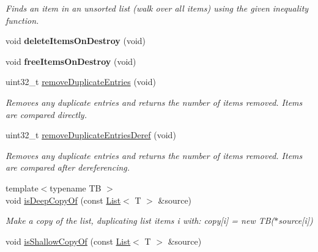 \begin{DoxyCompactItemize}
\begin{DoxyCompactList}\small\item\em \-Finds an item in an unsorted list (walk over all items) using the given inequality function. \end{DoxyCompactList}\item 
\hypertarget{classxsens_1_1List_a9fb26a3ec44163f759678e61cd8cdaf4}{void {\bfseries delete\-Items\-On\-Destroy} (void)}\label{classxsens_1_1List_a9fb26a3ec44163f759678e61cd8cdaf4}

\item 
\hypertarget{classxsens_1_1List_a066c09f452527b8235eb3a16bb3cef7d}{void {\bfseries free\-Items\-On\-Destroy} (void)}\label{classxsens_1_1List_a066c09f452527b8235eb3a16bb3cef7d}

\item 
\hypertarget{classxsens_1_1List_a0f37088f6e6cb46e2bebbc2e802321d7}{uint32\-\_\-t \hyperlink{classxsens_1_1List_a0f37088f6e6cb46e2bebbc2e802321d7}{remove\-Duplicate\-Entries} (void)}\label{classxsens_1_1List_a0f37088f6e6cb46e2bebbc2e802321d7}

\begin{DoxyCompactList}\small\item\em \-Removes any duplicate entries and returns the number of items removed. \-Items are compared directly. \end{DoxyCompactList}\item 
\hypertarget{classxsens_1_1List_acace958a744f9ed105637d02452e9d56}{uint32\-\_\-t \hyperlink{classxsens_1_1List_acace958a744f9ed105637d02452e9d56}{remove\-Duplicate\-Entries\-Deref} (void)}\label{classxsens_1_1List_acace958a744f9ed105637d02452e9d56}

\begin{DoxyCompactList}\small\item\em \-Removes any duplicate entries and returns the number of items removed. \-Items are compared after dereferencing. \end{DoxyCompactList}\item 
\hypertarget{classxsens_1_1List_af9e65f3e036ba39652d7705b34fa76fd}{{\footnotesize template$<$typename T\-B $>$ }\\void \hyperlink{classxsens_1_1List_af9e65f3e036ba39652d7705b34fa76fd}{is\-Deep\-Copy\-Of} (const \hyperlink{classxsens_1_1List}{\-List}$<$ \-T $>$ \&source)}\label{classxsens_1_1List_af9e65f3e036ba39652d7705b34fa76fd}

\begin{DoxyCompactList}\small\item\em \-Make a copy of the list, duplicating list items i with\-: copy\mbox{[}i\mbox{]} = new \-T\-B($\ast$source\mbox{[}i\mbox{]}) \end{DoxyCompactList}\item 
\hypertarget{classxsens_1_1List_a71bac467060c48fcdf2d81b70b6bc06f}{void \hyperlink{classxsens_1_1List_a71bac467060c48fcdf2d81b70b6bc06f}{is\-Shallow\-Copy\-Of} (const \hyperlink{classxsens_1_1List}{\-List}$<$ \-T $>$ \&source)}\label{classxsens_1_1List_a71bac467060c48fcdf2d81b70b6bc06f}


\end{DoxyCompactItemize}

